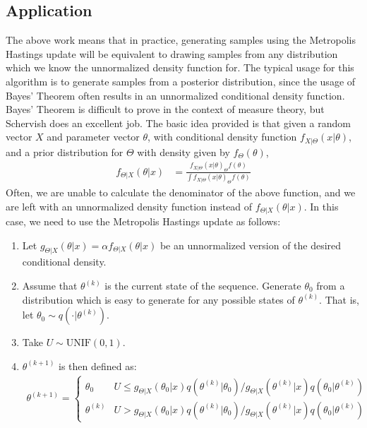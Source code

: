 \documentclass[10pt]{article}
\begin{document}
\subsection{Application}
\noindent
The above work means that in practice, generating samples using the Metropolis Hastings update will be equivalent to drawing samples from any distribution which we know the unnormalized density function for. The typical usage for this algorithm is to generate samples from a posterior distribution, since the usage of Bayes' Theorem often results in an unnormalized conditional density function. 
\\[1\baselineskip]
\noindent
Bayes' Theorem is difficult to prove in the context of measure theory, but Schervish \cite{schervish} does an excellent job. The basic idea provided is that given a random vector $X$ and parameter vector $\theta$, with conditional density function $f_{X | \Theta} \left( x | \theta \right)$, and a prior distribution for $\Theta$ with density given by $f_{\Theta} \left( \theta \right)$,
\begin{align*}
    f_{\Theta | X} \left(\theta | x \right) &= \frac{f_{X | \Theta} \left( x | \theta \right)_{\Theta} f \left( \theta \right)}{\int f_{X | \Theta} \left( x | \theta \right)_{\Theta} f \left( \theta \right)}
\end{align*}
Often, we are unable to calculate the denominator of the above function, and we are left with an unnormalized density function instead of $f_{\Theta | X} \left(\theta | x \right)$. In this case, we need to use the Metropolis Hastings update as follows:
\begin{enumerate}
    \item Let $g_{\Theta | X} \left(\theta | x \right) = \alpha f_{\Theta | X} \left(\theta | x \right)$ be an unnormalized version of the desired conditional density.
    \item Assume that $\theta^{\left( k \right)}$ is the current state of the sequence. Generate $\theta_{0}$ from a distribution which is easy to generate for any possible states of $\theta^{\left( k \right)}$. That is, let $\theta_{0} \sim q \left( \cdot | \theta^{\left( k \right)} \right)$.
    \item Take $U \sim \text{UNIF} \left( 0, 1 \right)$.
    \item $\theta^{\left( k+1 \right)}$ is then defined as:
    \\[1\baselineskip]
    \begin{align*}
    \theta^{\left( k+1 \right)} = 
    \begin{cases} 
      \theta_{0} & U \leq g_{\Theta | X} \left(\theta_{0} | x \right) q \left( \theta^{\left( k \right)} | \theta_{0} \right) / g_{\Theta | X} \left(\theta^{\left( k \right)} | x \right) q \left( \theta_{0} | \theta^{\left( k \right)} \right)  \\
      \theta^{\left( k \right)} & U > g_{\Theta | X} \left(\theta_{0} | x \right) q \left( \theta^{\left( k \right)} | \theta_{0} \right) / g_{\Theta | X} \left(\theta^{\left( k \right)} | x \right) q \left( \theta_{0} | \theta^{\left( k \right)} \right)
   \end{cases}
   \end{align*}
\end{enumerate}
\end{document}
